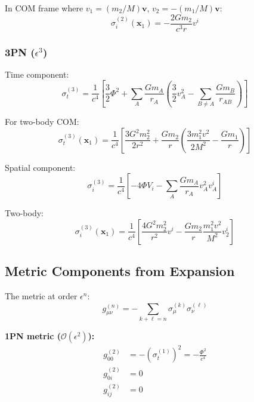 \documentclass[11pt,a4paper]{article}
\theoremstyle{definition}
\theoremstyle{remark}
\begin{document}
	In COM frame where $v_1 = (m_2/M)\mathbf{v}$, $v_2 = -(m_1/M)\mathbf{v}$:
	\begin{equation}
		\sigma_i^{(2)}(\mathbf{x}_1) = -\frac{2Gm_2}{c^3r}v^i
	\end{equation}
	
	\subsubsection{3PN ($\epsilon^3$)}
	
	Time component:
	\begin{equation}\label{eq:sigma_3pn_t}
		\boxed{\sigma_t^{(3)} = \frac{1}{c^4}\left[\frac{3}{2}\Phi^2 + \sum_A \frac{Gm_A}{r_A}\left(\frac{3}{2}v_A^2 - \sum_{B \neq A}\frac{Gm_B}{r_{AB}}\right)\right]}
	\end{equation}
	
	For two-body COM:
	\begin{equation}
		\sigma_t^{(3)}(\mathbf{x}_1) = \frac{1}{c^4}\left[\frac{3G^2m_2^2}{2r^2} + \frac{Gm_2}{r}\left(\frac{3m_1^2v^2}{2M^2} - \frac{Gm_1}{r}\right)\right]
	\end{equation}
	
	Spatial component:
	\begin{equation}\label{eq:sigma_3pn_i}
		\boxed{\sigma_i^{(3)} = \frac{1}{c^4}\left[-4\Phi V_i - \sum_A \frac{Gm_A}{r_A}v_A^2 v_A^i\right]}
	\end{equation}
	
	Two-body:
	\begin{equation}
		\sigma_i^{(3)}(\mathbf{x}_1) = \frac{1}{c^4}\left[\frac{4G^2m_2^2}{r^2}v^i - \frac{Gm_2}{r}\frac{m_1^2v^2}{M^2}v_2^i\right]
	\end{equation}
	
	\subsection{Metric Components from Expansion}
	
	The metric at order $\epsilon^n$:
	\begin{equation}
		g_{\mu\nu}^{(n)} = -\sum_{k+\ell=n}\sigma_\mu^{(k)}\sigma_\nu^{(\ell)}
	\end{equation}
	
	\textbf{1PN metric ($\mathcal{O}(\epsilon^2)$):}
	\begin{align}
		g_{00}^{(2)} &= -(\sigma_t^{(1)})^2 = -\frac{\Phi^2}{c^4}\\
		g_{0i}^{(2)} &= 0\\
		g_{ij}^{(2)} &= 0
	\end{align}
	
\end{document}
